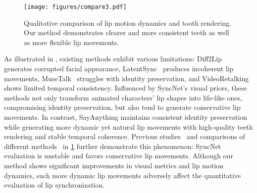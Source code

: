 \begin{figure}[!htp]
    \centering
    \texttt{[image: figures/compare3.pdf]}
    \caption{Qualitative comparison of lip motion dynamics and tooth rendering. Our method demonstrates clearer and more consistent teeth as well as more flexible lip movements.}
    \label{fig:compare-teeth}
\end{figure}

As illustrated in , existing methods exhibit various limitations: Diff2Lip~\citep{mukhopadhyay2024diff2lip} generates corrupted facial appearance, LatentSync~\citep{li2024latentsync} produces incoherent lip movements, MuseTalk~\citep{zhang2024musetalk} struggles with identity preservation, and VideoRetalking~\citep{cheng2022videoretalking} shows limited temporal consistency. Influenced by SyncNet's visual priors, these methods not only transform animated characters' lip shapes into life-like ones, compromising identity preservation, but also tend to generate conservative lip movements. In contrast, SayAnything maintains consistent identity preservation while generating more dynamic yet natural lip movements with high-quality teeth rendering and stable temporal coherence. Previous studies~\citep{jiang2024loopy,yaman2023plug} and comparisons of different methods~\citep{mukhopadhyay2024diff2lip,zhang2024musetalk,li2024latentsync,cheng2022videoretalking} in \cref{fig:compare-teeth} further demonstrate this phenomenon: SyncNet evaluation is unstable and favors conservative lip movements. Although our method shows significant improvements in visual metrics and lip motion dynamics, such more dynamic lip movements adversely affect the quantitative evaluation of lip synchronization.

\begin{table}[!htp]
\vspace{-0.5cm}
\caption{User preference rates (\%) across different scenarios. 
Users select one preferred method per test case. 
User study results across four video template categories 
Users upload their audio for testing. 
Results from 500 users show that SayAnything achieves the highest preference rates across all scenarios.}
\label{tab:userstudy}
\vskip 0.15in
\centering
{}
\vskip -0.1in
\end{table}


